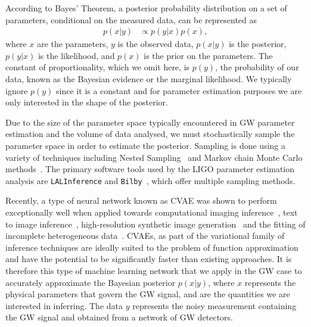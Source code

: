\documentclass{article}
\begin{document}
%
%
According to Bayes' Theorem, a posterior probability distribution on a set of
parameters, conditional on the measured data, can be represented as
%
\begin{align}\label{eq:bayes_theorem} 
p(x|y) &\propto p(y|x) p(x), 
\end{align}
%
where $x$ are the parameters, $y$ is the observed data, $p(x|y)$ is the
posterior, $p(y|x)$ is the likelihood, and $p(x)$ is the prior on the
parameters. The constant of proportionality, which we omit here, is
$p(y)$, the probability of our data, known as the Bayesian evidence or the
marginal likelihood. We typically ignore $p(y)$ since it is a constant and for
parameter estimation purposes we are only interested in the shape of the
posterior.

%
%
Due to the size of the parameter space typically encountered in \ac{GW}
parameter estimation and the volume of data analysed, we must stochastically
sample the parameter space in order to estimate the posterior.  Sampling is
done using a variety of techniques including Nested
Sampling~\cite{skilling2006,cpnest,dynesty} and Markov chain Monte Carlo
methods~\cite{emcee,ptemcee}. The primary software tools used by the \ac{LIGO}
parameter estimation analysis are \texttt{LALInference} and
\texttt{Bilby}~\cite{1409.7215,1811.02042}, which offer multiple sampling
methods.  
  
%
%

%
%
Recently, a type of neural network known as \ac{CVAE} was shown to perform
exceptionally well when applied towards computational imaging
inference~\cite{1904.06264,NIPS2015_5775}, text to image
inference~\cite{1512.00570}, high-resolution synthetic image
generation~\cite{1612.00005} and the fitting of incomplete heterogeneous
data~\cite{1807.03653}. \acp{CVAE}, as part of the variational family of
inference techniques are ideally suited to the problem of function
approximation and have the potential to be significantly faster than existing
approaches. It is therefore this type of machine learning network that we
apply in the \ac{GW} case to accurately approximate the Bayesian posterior
$p(x|y)$, where $x$ represents the physical parameters that govern the
\ac{GW} signal, and are the quantities we are interested in inferring. The data
$y$ represents the noisy measurement containing the \ac{GW} signal and obtained
from a network of \ac{GW} detectors. 
\end{document}
